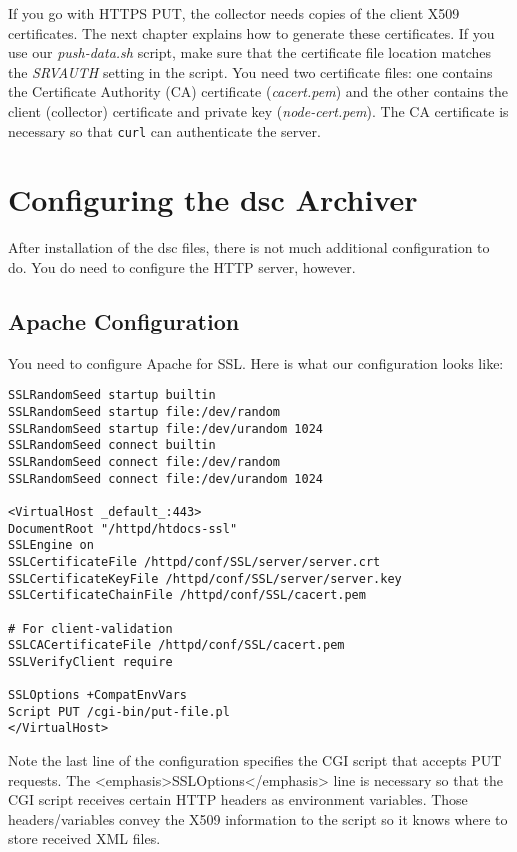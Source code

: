 \documentclass{report}
\def\dsc{{\sc dsc}}
\begin{document}
If you go with HTTPS PUT, the collector needs copies of the client
X509 certificates.  The next chapter explains how to generate these
certificates.  If you use our {\em push-data.sh\/} script, make
sure that the certificate file location matches the {\em SRVAUTH\/}
setting in the script.  You need two certificate files: one contains
the Certificate Authority (CA) certificate ({\em cacert.pem\/}) and the
other contains the client (collector) certificate and private key
({\em node-cert.pem\/}).  The CA certificate is
necessary so that {\tt curl\/} can authenticate the server.


\chapter{Configuring the {\dsc} Archiver}

After installation of the {\dsc} files, there is not much additional
configuration to do.  You do need to configure the HTTP server, however.

\section{Apache Configuration}

\noindent
You need to configure Apache for SSL.  Here is what our configuration
looks like:

\begin{verbatim}
SSLRandomSeed startup builtin
SSLRandomSeed startup file:/dev/random
SSLRandomSeed startup file:/dev/urandom 1024
SSLRandomSeed connect builtin
SSLRandomSeed connect file:/dev/random
SSLRandomSeed connect file:/dev/urandom 1024

<VirtualHost _default_:443>
DocumentRoot "/httpd/htdocs-ssl"
SSLEngine on
SSLCertificateFile /httpd/conf/SSL/server/server.crt
SSLCertificateKeyFile /httpd/conf/SSL/server/server.key
SSLCertificateChainFile /httpd/conf/SSL/cacert.pem

# For client-validation
SSLCACertificateFile /httpd/conf/SSL/cacert.pem
SSLVerifyClient require

SSLOptions +CompatEnvVars
Script PUT /cgi-bin/put-file.pl
</VirtualHost>
\end{verbatim}

\noindent
Note the last line of the configuration specifies the CGI script
that accepts PUT requests.  The <emphasis>SSLOptions</emphasis>
line is necessary so that the CGI script receives certain HTTP
headers as environment variables.  Those headers/variables convey
the X509 information to the script so it knows where to store
received XML files.
\end{document}
